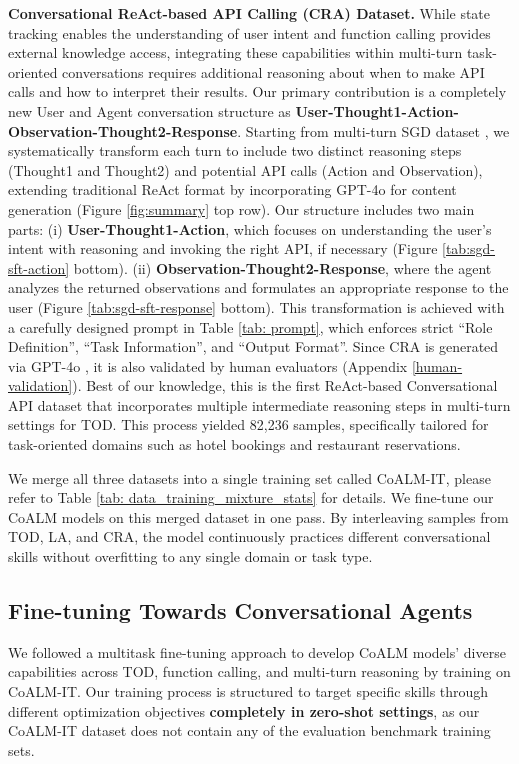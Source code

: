 \noindent\textbf{Conversational ReAct-based API Calling (CRA) Dataset.} While state tracking enables the understanding of user intent and function calling provides external knowledge access, integrating these capabilities within multi-turn task-oriented conversations requires additional reasoning about when to make API calls and how to interpret their results. Our primary contribution is a completely new User and Agent conversation structure as \textbf{User-Thought1-Action-Observation-Thought2-Response}. Starting from multi-turn SGD dataset \cite{rastogi2020sgd}, we systematically transform each turn to include two distinct reasoning steps (Thought1 and Thought2) and potential API calls (Action and Observation), extending traditional ReAct format \cite{yao2023reactsynergizingreasoningacting-react} by incorporating GPT-4o for content generation (Figure \ref{fig:summary} top row). Our structure includes two main parts: (i) \textbf{User-Thought1-Action}, which focuses on understanding the user's intent with reasoning and invoking the right API, if necessary (Figure \ref{tab:sgd-sft-action} bottom). (ii) \textbf{Observation-Thought2-Response}, where the agent analyzes the returned observations and formulates an appropriate response to the user (Figure \ref{tab:sgd-sft-response} bottom). This transformation is achieved with a carefully designed prompt in Table \ref{tab: prompt}, which enforces strict “Role Definition”, “Task Information”, and “Output Format”. Since CRA is generated via GPT-4o \cite{Achiam2023GPT4TR}, it is also validated by human evaluators (Appendix \ref{human-validation}). Best of our knowledge, this is the first ReAct-based Conversational API dataset that incorporates multiple intermediate reasoning steps in multi-turn settings for TOD. This process yielded 82,236 samples, specifically tailored for task-oriented domains such as hotel bookings and restaurant reservations. 

\vspace{3mm}

We merge all three datasets into a single training set called CoALM-IT, please refer to Table \ref{tab: data_training_mixture_stats} for details. We fine-tune our CoALM models on this merged dataset in one pass. By interleaving samples from TOD, LA, and CRA, the model continuously practices different conversational skills without overfitting to any single domain or task type.

\subsection{Fine-tuning Towards Conversational Agents}
We followed a multitask fine-tuning approach to develop CoALM models' diverse capabilities across TOD, function calling, and multi-turn reasoning by training on CoALM-IT. Our training process is structured to target specific skills through different optimization objectives \textbf{completely in zero-shot settings}, as our CoALM-IT dataset does not contain any of the evaluation benchmark training sets.

